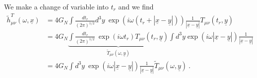     We make a change of variable into $t_r$ and we find 
    \begin{equation*}
    \begin{aligned}
        \tilde h^T_{\mu\nu} (\omega, \underline x) & = 4 G_N \int \frac{dt_r}{(2\pi)^{1/2}} d^3 y ~ \exp(i \omega (t_r + |\underline x - \underline y|)) \frac{1}{|\underline x - \underline y|} T_{\mu\nu} (t_r, \underline y) \\ & = 4 G_N \underbrace{\int \frac{dt_r}{(2\pi)^{1/2}} ~ \exp(i \omega t_r) T_{\mu\nu} (t_r, \underline y) }_{\tilde T_{\mu\nu} (\omega, \underline{y})} \int d^3 y \exp(i \omega |\underline x - \underline y|) \frac{1}{|\underline x - \underline y|} \\ & = 4 G_N \int d^3 y ~ \exp(i \omega |\underline x - \underline y|) \frac{1}{|\underline x - \underline y|}  \tilde T_{\mu\nu} (\omega, \underline{y}) ~.
    \end{aligned}
    \end{equation*}

